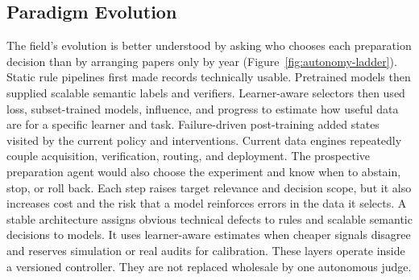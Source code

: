 \subsection{Paradigm Evolution}

The field's evolution is better understood by asking who chooses each preparation decision than by arranging papers only by year (Figure~\ref{fig:autonomy-ladder}).
Static rule pipelines first made records technically usable.
Pretrained models then supplied scalable semantic labels and verifiers.
Learner-aware selectors then used loss, subset-trained models, influence, and progress to estimate how useful data are for a specific learner and task.
Failure-driven post-training added states visited by the current policy and interventions.
Current data engines repeatedly couple acquisition, verification, routing, and deployment.
The prospective preparation agent would also choose the experiment and know when to abstain, stop, or roll back.
Each step raises target relevance and decision scope, but it also increases cost and the risk that a model reinforces errors in the data it selects.
A stable architecture assigns obvious technical defects to rules and scalable semantic decisions to models.
It uses learner-aware estimates when cheaper signals disagree and reserves simulation or real audits for calibration.
These layers operate inside a versioned controller.
They are not replaced wholesale by one autonomous judge.
